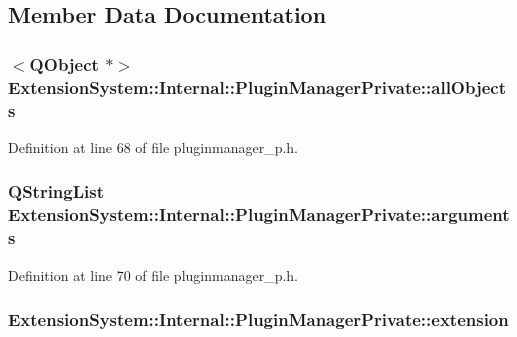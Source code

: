 \subsection{Member Data Documentation}
\hypertarget{class_extension_system_1_1_internal_1_1_plugin_manager_private_a33d08f94e70bb4ecf53a00ed840f02a1}{
\subsubsection[{all\-Objects}]{$<$Q\-Object $\ast$$>$ Extension\-System\-::\-Internal\-::\-Plugin\-Manager\-Private\-::all\-Objects}}\label{class_extension_system_1_1_internal_1_1_plugin_manager_private_a33d08f94e70bb4ecf53a00ed840f02a1}


Definition at line 68 of file pluginmanager\-\_\-p.\-h.

\hypertarget{class_extension_system_1_1_internal_1_1_plugin_manager_private_ae4cd1bb87340f771e64431172280191c}{
\subsubsection[{arguments}]{\setlength{\rightskip}{0pt plus 5cm}Q\-String\-List Extension\-System\-::\-Internal\-::\-Plugin\-Manager\-Private\-::arguments}}\label{class_extension_system_1_1_internal_1_1_plugin_manager_private_ae4cd1bb87340f771e64431172280191c}


Definition at line 70 of file pluginmanager\-\_\-p.\-h.

\hypertarget{class_extension_system_1_1_internal_1_1_plugin_manager_private_ac92959afcbee3882ac4df6bf9d00d6b2}{
\subsubsection[{extension}]{ Extension\-System\-::\-Internal\-::\-Plugin\-Manager\-Private\-::extension}}\label{class_extension_system_1_1_internal_1_1_plugin_manager_private_ac92959afcbee3882ac4df6bf9d00d6b2}


